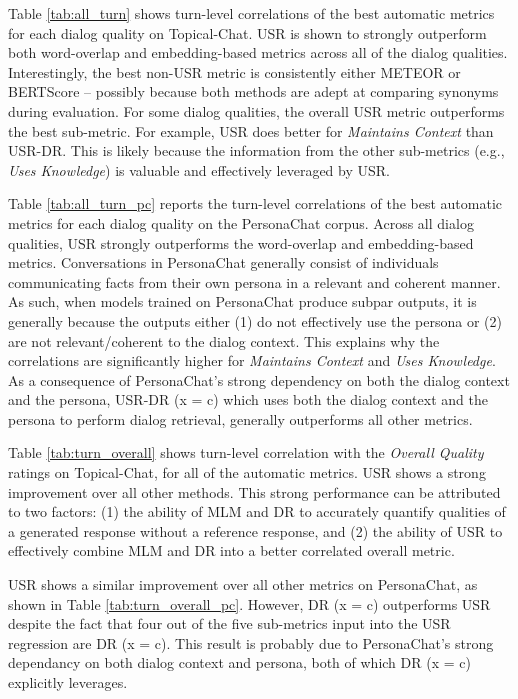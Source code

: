 \documentclass[11pt,a4paper]{article}
\begin{document}
Table \ref{tab:all_turn} shows turn-level correlations of the best automatic metrics for each dialog quality on Topical-Chat. USR is shown to strongly outperform both word-overlap and embedding-based metrics across all of the dialog qualities. Interestingly, the best non-USR metric is consistently either METEOR or BERTScore -- possibly because both methods are adept at comparing synonyms during evaluation. For some dialog qualities, the overall USR metric outperforms the best sub-metric. For example, USR does better for \textit{Maintains Context} than USR-DR. This is likely because the information from the other sub-metrics (e.g., \textit{Uses Knowledge}) is valuable and effectively leveraged by USR.

Table \ref{tab:all_turn_pc} reports the turn-level correlations of the best automatic metrics for each dialog quality on the PersonaChat corpus. Across all dialog qualities, USR strongly outperforms the word-overlap and embedding-based metrics. Conversations in PersonaChat generally consist of individuals communicating facts from their own persona in a relevant and coherent manner. As such, when models trained on PersonaChat produce subpar outputs, it is generally because the outputs either (1) do not effectively use the persona or (2) are not relevant/coherent to the dialog context. This explains why the correlations are significantly higher for \textit{Maintains Context} and \textit{Uses Knowledge}. As a consequence of PersonaChat's strong dependency on both the dialog context and the persona, USR-DR (x = c) which uses both the dialog context and the persona to perform dialog retrieval, generally outperforms all other metrics.  

Table \ref{tab:turn_overall} shows turn-level correlation with the \textit{Overall Quality} ratings on Topical-Chat, for all of the automatic metrics. USR shows a strong improvement over all other methods. This strong performance can be attributed to two factors: (1) the ability of MLM and DR to accurately quantify qualities of a generated response without a reference response, and (2) the ability of USR to effectively combine MLM and DR into a better correlated overall metric. 

USR shows a similar improvement over all other metrics on PersonaChat, as shown in Table \ref{tab:turn_overall_pc}. However, DR (x = c) outperforms USR despite the fact that four out of the five sub-metrics input into the USR regression are DR (x = c). This result is probably due to PersonaChat's strong dependancy on both dialog context and persona, both of which DR (x = c) explicitly leverages.
\end{document}
